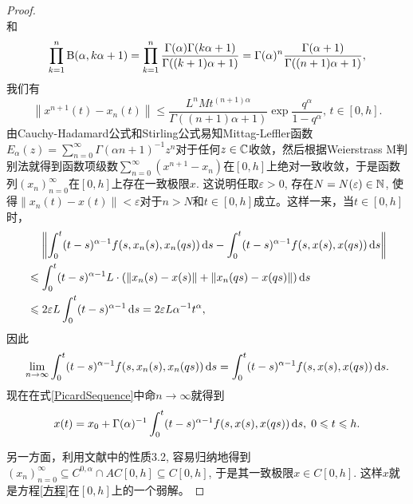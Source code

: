 \begin{proof}
\begin{equation*}
    \end{equation*}
    和
    \begin{equation*}
        \prod_{k=1}^n \mathrm{B}(\alpha, k\alpha+1)=\prod_{k=1}^n \frac{\Gamma(\alpha) \Gamma(k\alpha+1)}{\Gamma((k+1)\alpha+1)}=\Gamma(\alpha)^n \frac{\Gamma(\alpha+1)}{\Gamma((n+1)\alpha+1)},
    \end{equation*}
    我们有
    \begin{equation}
        \left\| x^{n+1}(t) - x_n(t) \right\|\leqslant \frac{L^n M t^{(n+1)\alpha}}{\Gamma((n+1)\alpha+1)} \exp \frac{q^\alpha}{1-q^\alpha},\,t\in [0,h].
    \end{equation}
    由Cauchy-Hadamard公式和Stirling公式易知Mittag-Leffler函数$E_\alpha(z)=\sum_{n=0}^{\infty}\Gamma(\alpha n+1)^{-1}z^n$对于任何$z\in \mathbb{C}$收敛，然后根据Weierstrass M判别法就得到函数项级数$\sum_{n=0}^\infty \left(x^{n+1}-x_n\right)$在$[0,h]$上绝对一致收敛，于是函数列$\left(x_n\right)_{n=0}^\infty$在$[0,h]$上存在一致极限$x$. 这说明任取$\varepsilon>0$, 存在$N=N(\varepsilon)\in \mathbb{N}$, 使得$\left\|x_n(t)-x(t)\right\|<\varepsilon$对于$n>N$和$t\in [0,h]$成立。这样一来，当$t\in [0,h]$时，
    \begin{align*}
        &\relphantom{\leqslant} \left\| \int_0^t (t-s)^{\alpha-1} f(s,x_n(s),x_n(qs))\differential s - \int_0^t (t-s)^{\alpha-1} f(s,x(s),x(qs))\differential s \right\|\\
        &\leqslant \int_0^t (t-s)^{\alpha-1} L\cdot\left(\left\|x_n(s)-x(s)\right\|+\left\|x_n(qs)-x(qs)\right\|\right) \differential s\\
        &\leqslant 2\varepsilon L\int_0^t (t-s)^{\alpha-1}\differential s = 2\varepsilon L\alpha^{-1}t^\alpha,
    \end{align*}
    因此
    \begin{equation*}
        \lim_{n\to\infty} \int_0^t (t-s)^{\alpha-1} f(s,x_n(s),x_n(qs))\mathop{}\!\mathrm{d} s = \int_0^t (t-s)^{\alpha-1} f(s,x(s),x(qs))\mathop{}\!\mathrm{d} s.
    \end{equation*}
    现在在式\eqref{PicardSequence}中命$n\to\infty$就得到
    \begin{equation*}
        x(t)=x_0 + \Gamma(\alpha)^{-1}\int_0^t (t-s)^{\alpha-1} f(s,x(s),x(qs))\mathop{}\!\mathrm{d} s,\;0\leqslant t\leqslant h.
    \end{equation*}

    另一方面，利用文献中的性质3.2, 容易归纳地得到$\left(x_n\right)_{n=0}^\infty \subseteq C^{0,\alpha} \cap AC [0,h] \subseteq C[0,h]$, 于是其一致极限$x\in C[0,h]$. 这样$x$就是方程\eqref{方程}在$[0,h]$上的一个弱解。


\end{proof}

